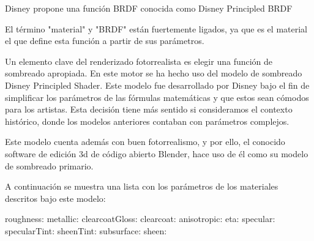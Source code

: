 Disney propone una función BRDF conocida como Disney Principled BRDF\cite{burley2012physically}
	
El término "material" y "BRDF" están fuertemente ligados, ya que es el material el que define esta función a partir de sus parámetros. 
		
	
Un elemento clave del renderizado fotorrealista es elegir una función de sombreado apropiada. En este motor se ha hecho uso del modelo de sombreado Disney Principled Shader. Este modelo fue desarrollado por Disney bajo el fin de simplificar los parámetros de las fórmulas matemáticas y que estos sean cómodos para los artistas. Esta decisión tiene más sentido si consideramos el contexto histórico, donde los modelos anteriores contaban con parámetros complejos.

Este modelo cuenta además con buen fotorrealismo, y por ello, el conocido software de edición 3d de código abierto Blender, hace uso de él como su modelo de sombreado primario.


A continuación se muestra una lista con los parámetros de los materiales descritos bajo este modelo:

	roughness:
	metallic:
	clearcoatGloss:
	clearcoat:
	anisotropic:
	eta:
	specular:
	specularTint:
	sheenTint:
	subsurface:
	sheen:
	
